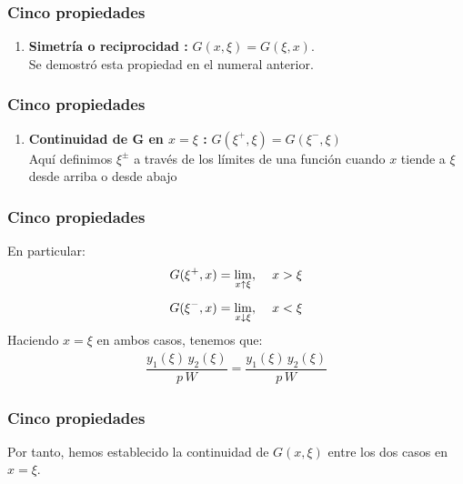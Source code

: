 \documentclass[12pt]{beamer}
\begin{document}
\begin{frame}
\frametitle{Cinco propiedades}
\begin{enumerate}[<+->]
\conti
\item \textbf{Simetría o reciprocidad :} $G (x, \xi) = G (\xi, x)$. 
\\
\bigskip
\pause
Se demostró esta propiedad en el numeral anterior.
\seti
\end{enumerate}
\end{frame}

\begin{frame}
\frametitle{Cinco propiedades}
\begin{enumerate}[<+->]
\conti
\item \textbf{Continuidad de $\mathbf{G}$ en $x = \xi$ :} $G (\xi^{+}, \xi) = G (\xi^{-}, \xi)$
\\
\bigskip
\pause
Aquí definimos $\xi^{\pm}$ a través de los límites de una función cuando $x$ tiende a $\xi$ desde arriba o desde abajo
\seti
\end{enumerate}
\end{frame}

\begin{frame}
\frametitle{Cinco propiedades}
En particular:
\pause
\begin{align*}
G (\xi^{+}, x) &= \lim_{x \uparrow \xi}, \hspace{0.4cm} x > \xi \\[0.5em]
G (\xi^{-}, x) &= \lim_{x \downarrow \xi}, \hspace{0.4cm} x < \xi
\end{align*}
\pause
Haciendo $x = \xi$ en ambos casos, tenemos que:
\pause
\begin{align*}
\dfrac{y_{1} (\xi) \, y_{2} (\xi)}{p \, W} = \dfrac{y_{1} (\xi) \, y_{2} (\xi)}{p \, W}
\end{align*}
\end{frame}

\begin{frame}
\frametitle{Cinco propiedades}
Por tanto, hemos establecido la continuidad de $G (x, \xi)$ entre los dos casos en $x = \xi$.
\end{frame}
\end{document}
